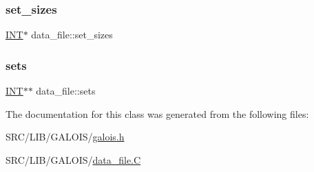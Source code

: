 \subsubsection{\texorpdfstring{set\+\_\+sizes}{set\_sizes}}
{\footnotesize\ttfamily \mbox{\hyperlink{galois_8h_a09fddde158a3a20bd2dcadb609de11dc}{I\+NT}}$\ast$ data\+\_\+file\+::set\+\_\+sizes}

\mbox{\label{classdata__file_ae6bf0e3e6374ad81b962551112a51d04}} 
\subsubsection{\texorpdfstring{sets}{sets}}
{\footnotesize\ttfamily \mbox{\hyperlink{galois_8h_a09fddde158a3a20bd2dcadb609de11dc}{I\+NT}}$\ast$$\ast$ data\+\_\+file\+::sets}



The documentation for this class was generated from the following files\+:\begin{DoxyCompactItemize}
\item 
S\+R\+C/\+L\+I\+B/\+G\+A\+L\+O\+I\+S/\mbox{\hyperlink{galois_8h}{galois.\+h}}\item 
S\+R\+C/\+L\+I\+B/\+G\+A\+L\+O\+I\+S/\mbox{\hyperlink{data__file_8_c}{data\+\_\+file.\+C}}\end{DoxyCompactItemize}
